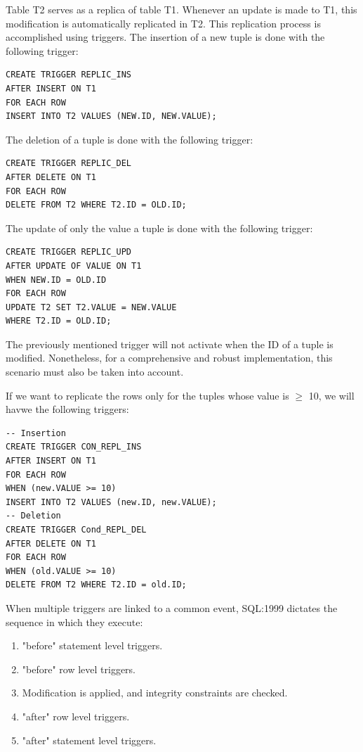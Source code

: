 \documentclass[12pt, a4paper]{report}
\begin{document}
    \begin{example}
        Table T2 serves as a replica of table T1. 
        Whenever an update is made to T1, this modification is automatically replicated in T2. 
        This replication process is accomplished using triggers.
        The insertion of a new tuple is done with the following trigger: 
        \begin{lstlisting}[style=SQL]
CREATE TRIGGER REPLIC_INS
AFTER INSERT ON T1
FOR EACH ROW
INSERT INTO T2 VALUES (NEW.ID, NEW.VALUE);
        \end{lstlisting}
        The deletion of a tuple is done with the following trigger: 
        \begin{lstlisting}[style=SQL]
CREATE TRIGGER REPLIC_DEL
AFTER DELETE ON T1
FOR EACH ROW
DELETE FROM T2 WHERE T2.ID = OLD.ID;
        \end{lstlisting}
        The update of only the value a tuple is done with the following trigger: 
        \begin{lstlisting}[style=SQL]
CREATE TRIGGER REPLIC_UPD
AFTER UPDATE OF VALUE ON T1
WHEN NEW.ID = OLD.ID
FOR EACH ROW
UPDATE T2 SET T2.VALUE = NEW.VALUE
WHERE T2.ID = OLD.ID;
        \end{lstlisting}
        The previously mentioned trigger will not activate when the ID of a tuple is modified. 
        Nonetheless, for a comprehensive and robust implementation, this scenario must also be taken into account.

        If we want to replicate the rows only for the tuples whose value is $\geq$ 10, we will havwe the following triggers: 
        \begin{lstlisting}[style=SQL]
-- Insertion
CREATE TRIGGER CON_REPL_INS
AFTER INSERT ON T1
FOR EACH ROW
WHEN (new.VALUE >= 10)
INSERT INTO T2 VALUES (new.ID, new.VALUE);
-- Deletion
CREATE TRIGGER Cond_REPL_DEL
AFTER DELETE ON T1
FOR EACH ROW
WHEN (old.VALUE >= 10)
DELETE FROM T2 WHERE T2.ID = old.ID;
        \end{lstlisting}
    \end{example}
    When multiple triggers are linked to a common event, SQL:1999 dictates the sequence in which they execute: 
    \begin{enumerate}
        \item "before" statement level triggers. 
        \item "before" row level triggers. 
        \item Modification is applied, and integrity constraints are checked.
        \item "after" row level triggers. 
        \item "after" statement level triggers.
    \end{enumerate}
\end{document}
